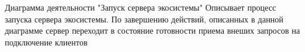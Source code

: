 Диаграмма деятельности "Запуск сервера экосистемы"
Описывает процесс запуска сервера экосистемы. По завершению действий, описанных в данной диаграмме сервер переходит в состояние готовности приема внеших запросов на подключение клиентов

